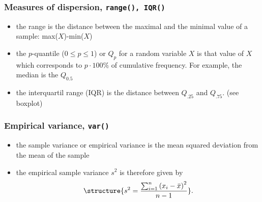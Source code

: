 \documentclass[extsize,handout,10pt]{beamer}\usepackage[]{graphicx}\usepackage[]{color}
\makeatletter
\newcommand{\hlopt}[1]{\textcolor[rgb]{0.251,0.251,0.251}{#1}}%
\newcommand{\hlstd}[1]{\textcolor[rgb]{0.251,0.251,0.251}{#1}}%
\newcommand{\hlkwb}[1]{\textcolor[rgb]{0,0.439,0.902}{#1}}%
\newcommand{\hlkwd}[1]{\textcolor[rgb]{0.69,0.188,0.941}{#1}}%
\newenvironment{kframe}{%
 \def\at@end@of@kframe{}%
 \ifinner\ifhmode%
  \def\at@end@of@kframe{\end{minipage}}%
  \begin{minipage}{\columnwidth}%
 \fi\fi%
 \def\FrameCommand##1{\hskip\@totalleftmargin \hskip-\fboxsep
 \colorbox{shadecolor}{##1}\hskip-\fboxsep
     \hskip-\linewidth \hskip-\@totalleftmargin \hskip\columnwidth}%
 \MakeFramed {\advance\hsize-\width
   \@totalleftmargin\z@ \linewidth\hsize
   \@setminipage}}%
 {\par\unskip\endMakeFramed%
 \at@end@of@kframe}
\newenvironment{knitrout}{}{} %
\makeatother
\begin{document}




\begin{frame}
  \frametitle{Measures of dispersion, \texttt{range(), IQR()}}
  \begin{itemize}
  \item<1-> the \alert{range} is the distance between the maximal and
    the minimal value of a sample: max($X$)-min($X$)
  \item<2-> the \alert{$p$-quantile} ($0 \leq p \leq 1$) or
    \alert{$Q_p$} for a random variable $X$ is that value of $X$ which
    corresponds to $p\cdot{100\%}$ of cumulative frequency. For
    example, the median \alert{is} the $Q_{0.5}$
  \item the \alert{interquartil range (IQR)} is the distance between
    $Q_{.25}$ and $Q_{.75}$. (see boxplot)
  \end{itemize}
\end{frame}


\begin{frame}
  \frametitle{Empirical variance, \texttt{var()}}
  \begin{itemize}
  \item the \alert{sample variance} or \alert{empirical variance} is
    the \alert{mean squared deviation} from the mean of the sample
  \item<2-> the empirical sample variance $s^2$ is therefore given by
      \begin{equation*}
        \structure{s^2=\frac{\sum_{i=1}^n{{(x_i-\bar{x})}^2}}{n-1}}.
        \label{Stichprobenvarianz}
      \end{equation*}
    \end{itemize}
  \end{frame}
\end{document}
